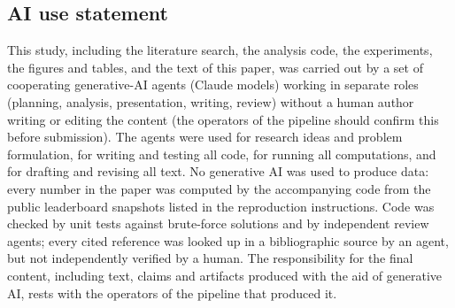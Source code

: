 \subsection*{AI use statement}
This study, including the literature search, the analysis code, the experiments, the figures and tables, and the
text of this paper, was carried out by a set of cooperating generative-AI agents (Claude models) working in separate
roles (planning, analysis, presentation, writing, review) without a human author writing or editing the content (the operators of the pipeline should confirm this before submission). The agents
were used for research ideas and problem formulation, for writing and testing all code, for running all
computations, and for drafting and revising all text. No generative AI was used to produce data: every number in the
paper was computed by the accompanying code from the public leaderboard snapshots listed in the reproduction
instructions. Code was checked by unit tests against brute-force solutions and by independent review agents; every
cited reference was looked up in a bibliographic source by an agent, but not independently verified by a human.
The responsibility for the final content, including text, claims and artifacts produced with the aid of
generative AI, rests with the operators of the pipeline that produced it.
